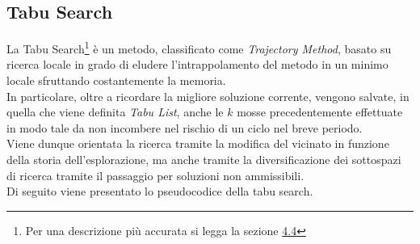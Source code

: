 \subsection{Tabu Search}
\noindent La Tabu Search\footnote[3]{Per una descrizione più accurata si legga la sezione \hyperref[sec:tabu-search]{4.4}} è un metodo, classificato come \textit{Trajectory Method}, basato su ricerca locale
in grado di eludere l'intrappolamento del metodo in un minimo locale sfruttando costantemente la memoria.\\
In particolare, oltre a ricordare la migliore soluzione corrente, vengono salvate, in quella che viene definita \textit{Tabu List},
anche le {$k$} mosse precedentemente effettuate in modo tale da non incombere nel rischio di un ciclo nel breve periodo.\\
Viene dunque orientata la ricerca tramite la modifica del vicinato in funzione della storia dell'esplorazione, ma anche tramite la diversificazione dei sottospazi di ricerca tramite il passaggio per soluzioni non ammissibili.\\
Di seguito viene presentato lo pseudocodice della tabu search.
